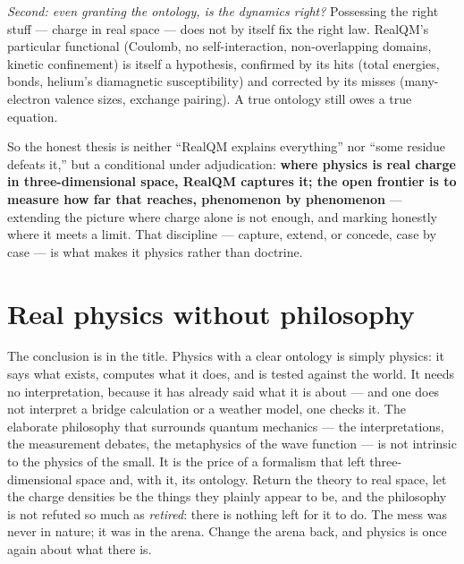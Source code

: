 \emph{Second: even granting the ontology, is the dynamics right?} Possessing the right stuff --- charge in real
space --- does not by itself fix the right law. RealQM's particular functional (Coulomb, no self-interaction,
non-overlapping domains, kinetic confinement) is itself a hypothesis, confirmed by its hits (total energies,
bonds, helium's diamagnetic susceptibility) and corrected by its misses (many-electron valence sizes, exchange
pairing). A true ontology still owes a true equation.

So the honest thesis is neither ``RealQM explains everything'' nor ``some residue defeats it,'' but a conditional
under adjudication: \textbf{where physics is real charge in three-dimensional space, RealQM captures it; the open
frontier is to measure how far that reaches, phenomenon by phenomenon} --- extending the picture where charge
alone is not enough, and marking honestly where it meets a limit. That discipline --- capture, extend, or
concede, case by case --- is what makes it physics rather than doctrine.

\section{Real physics without philosophy}\label{sec:no-philosophy}

The conclusion is in the title. Physics with a clear ontology is simply physics: it says what exists, computes
what it does, and is tested against the world. It needs no interpretation, because it has already said what it is
about --- and one does not interpret a bridge calculation or a weather model, one checks it. The elaborate
philosophy that surrounds quantum mechanics --- the interpretations, the measurement debates, the metaphysics of
the wave function --- is not intrinsic to the physics of the small. It is the price of a formalism that left
three-dimensional space and, with it, its ontology. Return the theory to real space, let the charge densities be
the things they plainly appear to be, and the philosophy is not refuted so much as \emph{retired}: there is
nothing left for it to do. The mess was never in nature; it was in the arena. Change the arena back, and physics
is once again about what there is.

